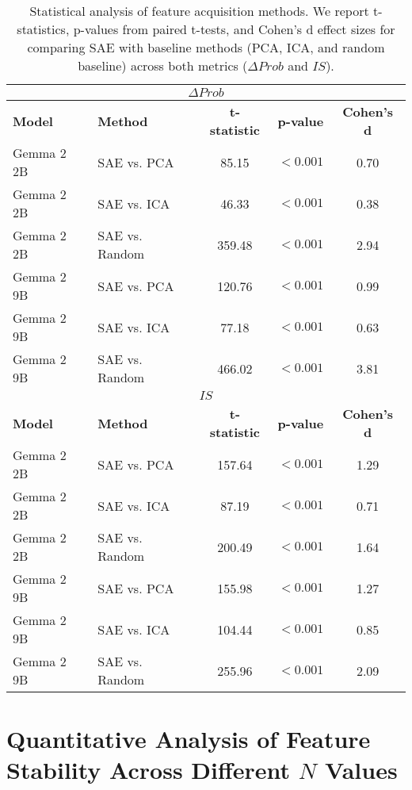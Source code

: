 \begin{table*}[h]
\centering
\begin{tabular}{llccc}
\toprule
\multicolumn{5}{c}{\textbf{$\Delta Prob$}} \\
\toprule
\textbf{Model} & \textbf{Method} & \textbf{t-statistic} & \textbf{p-value} & \textbf{Cohen's d} \\
\midrule
Gemma 2 2B & SAE vs. PCA & 85.15 & $<0.001$ & 0.70 \\
Gemma 2 2B & SAE vs. ICA & 46.33 & $<0.001$ & 0.38 \\
Gemma 2 2B & SAE vs. Random & 359.48 & $<0.001$ & 2.94 \\
\midrule
Gemma 2 9B & SAE vs. PCA & 120.76 & $<0.001$ & 0.99 \\
Gemma 2 9B & SAE vs. ICA & 77.18 & $<0.001$ & 0.63 \\
Gemma 2 9B & SAE vs. Random & 466.02 & $<0.001$ & 3.81 \\
\midrule
\multicolumn{5}{c}{\textbf{$IS$}} \\
\toprule
\textbf{Model} & \textbf{Method} & \textbf{t-statistic} & \textbf{p-value} & \textbf{Cohen's d} \\
\midrule
Gemma 2 2B & SAE vs. PCA & 157.64 & $<0.001$ & 1.29 \\
Gemma 2 2B & SAE vs. ICA & 87.19 & $<0.001$ & 0.71 \\
Gemma 2 2B & SAE vs. Random & 200.49 & $<0.001$ & 1.64 \\
\midrule
Gemma 2 9B & SAE vs. PCA & 155.98 & $<0.001$ & 1.27 \\
Gemma 2 9B & SAE vs. ICA & 104.44 & $<0.001$ & 0.85 \\
Gemma 2 9B & SAE vs. Random & 255.96 & $<0.001$ & 2.09 \\
\bottomrule
\end{tabular}
\caption{Statistical analysis of feature acquisition methods. We report t-statistics, p-values from paired t-tests, and Cohen's d effect sizes for comparing SAE with baseline methods (PCA, ICA, and random baseline) across both metrics ($\Delta Prob$ and $IS$).}
\label{table:appendix:statistical_tests:preliminary}
\end{table*}



\section{Quantitative Analysis of Feature Stability Across Different $N$ Values}
\label{section:appendix-feature-stability}

